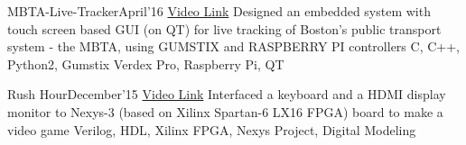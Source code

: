 \begin{projects}
	\project
	{MBTA-Live-Tracker}{April'16}
	{ \href{https://www.youtube.com/watch?v=DtY4qqCeVRI}{\faYoutube Video Link}}
	{Designed an embedded system with touch screen based GUI (on QT) for live tracking of Boston’s public transport system - the MBTA, using GUMSTIX and RASPBERRY PI controllers}
	{C, C++, Python2, Gumstix Verdex Pro, Raspberry Pi, QT }

	\project
	{Rush Hour}{December'15}
	{ \href{https://youtu.be/s36H25OkzVQ}{\faYoutube Video Link}}
	{Interfaced a keyboard and a HDMI display monitor to Nexys-3 (based on Xilinx Spartan-6 LX16 FPGA) board to make a video game}
	{Verilog, HDL, Xilinx FPGA, Nexys Project, Digital Modeling}
\end{projects}

